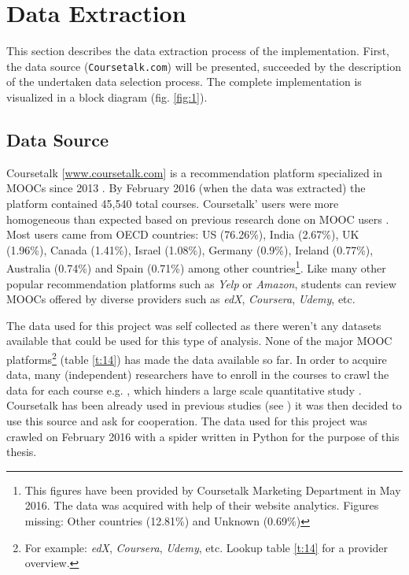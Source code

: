 \documentclass[
	a4paper,
	pdftex,
	12pt,	
	footinclude=true,
	fleqn,
	final,
	]{report}%
\begin{document}
\vspace{-0.5cm}
\section{Data Extraction}%
\label{sec:dat_extr}
\vspace{-0.3cm}
This section describes the data extraction process of the implementation. 
First, the data source (\texttt{Coursetalk.com}) will be presented, succeeded 
by the description of the undertaken data selection process. The complete
implementation is visualized in a block diagram (fig. \ref{fig:1}).

\vspace{-0.45cm}
\subsection{Data Source}
\vspace{-0.3cm}

Coursetalk [\url{www.coursetalk.com}] is a recommendation platform specialized in MOOCs since 2013 
\cite{Coursetalk2015}. By February 2016 (when the data was extracted) the platform contained 45,540 
total courses. Coursetalk' users were more homogeneous than expected based on previous research done on
MOOC users \cite{Ho2013,Ho2015a,Koller2015}. Most users came from OECD countries: 
US (76.26\%), India (2.67\%), UK (1.96\%), Canada (1.41\%), Israel (1.08\%), 
Germany (0.9\%), Ireland (0.77\%), Australia (0.74\%) and Spain (0.71\%) 
among other countries\footnote{
This figures have been provided by Coursetalk Marketing Department in May 2016. The data was acquired with help of their website analytics.
Figures missing: Other countries (12.81\%) and Unknown (0.69\%)}.
Like many other popular recommendation platforms such as \emph{Yelp} or \emph{Amazon}, 
students can review MOOCs offered by diverse providers such as \emph{edX}, 
\emph{Coursera}, \emph{Udemy}, etc. 

The data used for this project was self collected as there weren't any datasets available that could be used for this type of 
analysis. None of the major MOOC platforms\footnote{For example: \emph{edX}, 
\emph{Coursera}, \emph{Udemy}, etc. Lookup table \ref{t:14} for a provider overview.} (table \ref{t:14})
has made the data available so far. In order to acquire data, many (independent) researchers 
have to enroll in the courses to crawl the data for each course e.g. \cite{Adamopoulos2013} ,
which hinders a large scale quantitative study \cite{Taylor2012}. Coursetalk has been already 
used in previous studies (see \cite{Adamopoulos2013}) it was then decided to use this source 
and ask for cooperation. The data used for this project was crawled on February 2016 with a 
spider written in Python for the purpose of this thesis. 
\end{document}
